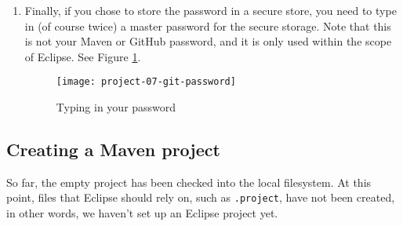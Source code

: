 \begin{enumerate}
\item Finally, if you chose to store the password in a secure store, you need to type in (of course twice) a master password for the secure storage. Note that this is not your Maven or GitHub password, and it is only used within the scope of Eclipse. See Figure \ref{project-07-git-password}.

\begin{figure}[t]
\centering
\texttt{[image: project-07-git-password]}
\caption{Typing in your password\label{project-07-git-password}}
\end{figure}

\end{enumerate}

\subsection{Creating a Maven project}

So far, the empty project has been checked into the local filesystem. At this point, files that Eclipse should rely on, such as \verb|.project|, have not been created, in other words, we haven't set up an Eclipse project yet.

